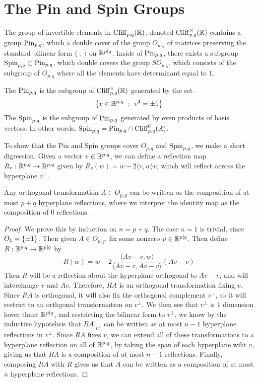 %
\section{The Pin and Spin Groups}
%
The group of invertible elements in $\operatorname{Cliff}_{p,q}(\mathbb{R})$, denoted
$\operatorname{Cliff}_{p,q}^\times(\mathbb{R})$ contains a group $\mathrm{Pin}_{p,q}$, which a double
cover of the group $O_{p,q}$ of matrices preserving the standard bilinear
form $\langle \cdot,\cdot \rangle$ on $\mathbb{R}^{p|q}$. Inside of $\mathrm{Pin}_{p,q}$,
there exists a subgroup $\mathrm{Spin}_{p,q} \subset \mathrm{Pin}_{p,q}$, which double covers
the group $SO_{p,q}$, which consists of the subgroup of $O_{p,q}$ where
all the elements have determinant equal to $1$.
%
\begin{defn}
The  $\mathrm{Pin}_{p,q}$ is the subgroup of $\operatorname{Cliff}_{p,q}^\times(\mathbb{R})$
generated by the set
\[
\left\lbrace v \in \mathbb{R}^{p,q} ~:~ v^2 = \pm 1 \right\rbrace
\]
The  $\mathrm{Spin}_{p,q}$ is the subgroup of $\mathrm{Pin}_{p,q}$ generated by even
products of basis vectors. In other words, $\mathrm{Spin}_{p,q} = \mathrm{Pin}_{p,q} \cap \operatorname{Cliff}_{p,q}^0(\mathbb{R})$.
\end{defn}
%
To show that the Pin and Spin groups cover $O_{p,q}$ and $\mathrm{Spin}_{p,q}$, we make
a short digression. Given a vector $v \in \mathbb{R}^{p,q}$, we can define a reflection
map $R_v : \mathbb{R}^{p,q} \to \mathbb{R}^{p,q}$ given by $R_v(w) = w - 2\langle v,w \rangle v$,
which will reflect across the hyperplane $v^\perp$.
%
\begin{thm}
Any orthogonal transformation $A \in O_{p,q}$ can be written as the composition
of at most $p+q$ hyperplane reflections, where we interpret the identity map as the
composition of $0$ reflections.
\end{thm}
%
\begin{proof}
We prove this by induction on $n = p+q$. The case $n=1$ is trivial, since
$O_1 = \left\lbrace \pm 1 \right\rbrace$. Then given $A \in O_{p,q}$, fix some nonzero $v \in \mathbb{R}^{p|q}$.
Then define $R : \mathbb{R}^{p|q} \to \mathbb{R}^{p|q}$ by
\[
R(w) = w - 2 \frac{\langle Av - v,w \rangle}{\langle Av -v, Av - v\rangle}(Av - v)
\]
Then $R$ will be a reflection about the hyperplane orthogonal to $Av - v$,
and will interchange $v$ and $Av$. Therefore, $RA$ is an orthogonal transformation
fixing $v$. Since $RA$ is orthogonal, it will also fix the orthogonal complement
$v^\perp$, so it will restrict to an orthgonal transformation on $v^\perp$. We
then see that $v^\perp$ is $1$ dimension lower thant $\mathbb{R}^{p|q}$, and restricting
the bilinear form to $v^\perp$, we know by the inductive hypotehsis that
$RA\vert_{v^\perp}$ can be written as at most $n-1$ hyperplane reflections in
$v^\perp$. Since $RA$ fixes $v$, we can extend all of these transformations to
a hyperplane reflection on all of $\mathbb{R}^{p|q}$, by taking the span of each hyperplane
wiht $v$, giving us that $RA$ is a composition of at most $n-1$ reflections. Finally,
composing $RA$ with $R$ gives us that $A$ can be written as a composition of at most
$n$ hyperplane reflections.
\end{proof}
